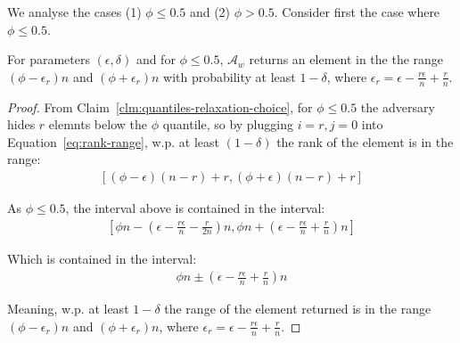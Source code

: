 We analyse the cases (1) $\phi \leq 0.5$ and (2) $\phi > 0.5$. Consider first the case where $\phi \leq 0.5$.
\begin{claim}
    For parameters $(\epsilon,\delta)$ and for $\phi \leq 0.5$, ${\mathcal{A}}_w$ returns an element in the the range 
    $(\phi-\epsilon_r)n$ and $(\phi+\epsilon_r)n$ with probability at
    least $1-\delta$, where $\epsilon_r=\epsilon - \frac{r \epsilon}{n} + \frac{r}{n}$.
    \label{clm:phi-under-half}
\end{claim}
\begin{proof}
    From Claim~\ref{clm:quantiles-relaxation-choice}, for $\phi \leq 0.5$ the adversary hides $r$ elemnts
    below the $\phi$ quantile, so by plugging $i=r,j=0$ into Equation~\ref{eq:rank-range}, w.p. at least $(1-\delta)$ the 
    rank of the element is in the range:
    \begin{align*}
        \left[ (\phi-\epsilon)(n-r)+r , (\phi+\epsilon)(n-r)+r \right]
    \end{align*}

    As $\phi \leq 0.5$, the interval above is contained in the interval:
    \begin{align*}
        \left[ \phi n - \left(\epsilon - \frac{r\epsilon}{n}-\frac{r}{2n}\right)n  , \phi n + \left(\epsilon - \frac{r\epsilon}{n}+\frac{r}{n}\right)n \right]
    \end{align*}

    Which is contained in the interval:
    \begin{align*}
        \phi n \pm \left(\epsilon - \frac{r\epsilon}{n}+\frac{r}{n}\right)n
    \end{align*}

    Meaning, w.p. at least $1-\delta$ the range of the element returned is in the range $(\phi-\epsilon_r)n$ and
    $(\phi+\epsilon_r)n$, where $\epsilon_r=\epsilon - \frac{r \epsilon}{n} + \frac{r}{n}$.
\end{proof}

